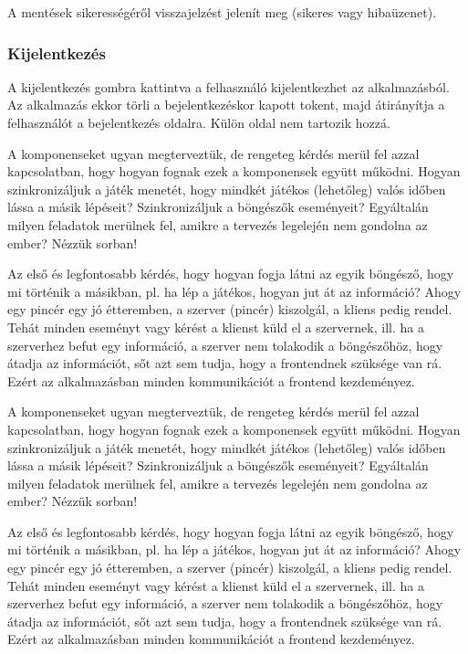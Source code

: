 A mentések sikerességéről visszajelzést jelenít meg (sikeres vagy hibaüzenet).

\subsubsection{Kijelentkezés}
A kijelentkezés gombra kattintva a felhasználó kijelentkezhet az alkalmazásból. Az alkalmazás ekkor törli a bejelentkezéskor kapott tokent, majd átirányítja a felhasználót a bejelentkezés oldalra. Külön oldal nem tartozik hozzá.


A komponenseket ugyan megterveztük, de rengeteg kérdés merül fel azzal kapcsolatban, hogy hogyan fognak ezek a komponensek együtt működni. Hogyan szinkronizáljuk a játék menetét, hogy mindkét játékos (lehetőleg) valós időben lássa a másik lépéseit? Szinkronizáljuk a böngészők eseményeit? Egyáltalán milyen feladatok merülnek fel, amikre a tervezés legelején nem gondolna az ember? Nézzük sorban!

Az első és legfontosabb kérdés, hogy hogyan fogja látni az egyik böngésző, hogy mi történik a másikban, pl. ha lép a játékos, hogyan jut át az információ? Ahogy egy pincér egy jó étteremben, a szerver (pincér) kiszolgál, a kliens pedig rendel. Tehát minden eseményt vagy kérést a klienst küld el a szervernek, ill. ha a szerverhez befut egy információ, a szerver nem tolakodik a böngészőhöz, hogy átadja az információt, sőt azt sem tudja, hogy a frontendnek szüksége van rá. Ezért az alkalmazásban minden kommunikációt a frontend kezdeményez.

A komponenseket ugyan megterveztük, de rengeteg kérdés merül fel azzal kapcsolatban, hogy hogyan fognak ezek a komponensek együtt működni. Hogyan szinkronizáljuk a játék menetét, hogy mindkét játékos (lehetőleg) valós időben lássa a másik lépéseit? Szinkronizáljuk a böngészők eseményeit? Egyáltalán milyen feladatok merülnek fel, amikre a tervezés legelején nem gondolna az ember? Nézzük sorban!

Az első és legfontosabb kérdés, hogy hogyan fogja látni az egyik böngésző, hogy mi történik a másikban, pl. ha lép a játékos, hogyan jut át az információ? Ahogy egy pincér egy jó étteremben, a szerver (pincér) kiszolgál, a kliens pedig rendel. Tehát minden eseményt vagy kérést a klienst küld el a szervernek, ill. ha a szerverhez befut egy információ, a szerver nem tolakodik a böngészőhöz, hogy átadja az információt, sőt azt sem tudja, hogy a frontendnek szüksége van rá. Ezért az alkalmazásban minden kommunikációt a frontend kezdeményez.

